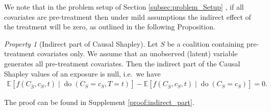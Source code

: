 \documentclass{article}
\theoremstyle{plain}
\theoremstyle{definition}
\theoremstyle{remark}
\newcommand{\Do}{\operatorname{do}}
\theoremstyle{mystyle}
\newtheorem{property}{Property}[section]
\begin{document}
We note that in the problem setup of Section \ref{subsec:problem_Setup}
, if all covariates are pre-treatment then under mild assumptions the indirect effect of the treatment will be zero, as outlined in the following Proposition.


\begin{property}[Indirect part of Causal Shapley] \label{prop:indirect_part} Let $S$ be a coalition containing pre-treatment covariates only. We assume that an unobserved (latent) variable generates all pre-treatment covariates. Then the indirect part of the Causal Shapley values of an exposure is null, i.e.~we have
\begin{align}
    \mathbb{E}\left[f\left({C}_{\bar{S}}, c_{S}, t\right) \mid \Do({C}_{S}=c_S, T=t)\right]-\mathbb{E}\left[f\left(C_{\bar{S}}, c_{S}, t\right) \mid \Do({C}_{S}=c_{S})\right]  = 0.
\end{align}
\end{property}

The proof can be found in Supplement  \ref{proof:indirect_part}.
\end{document}
